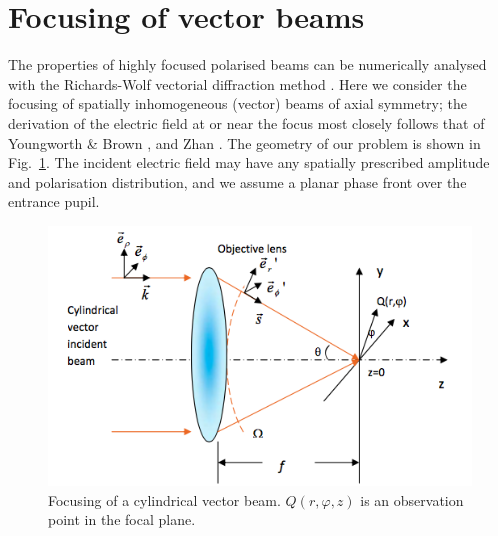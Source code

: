 \documentclass[12pt,a4paper]{article}
\begin{document}
\section{Focusing of vector beams}
The properties of highly focused polarised beams can be numerically analysed with the Richards-Wolf vectorial diffraction method \cite{richards_wolf}. Here we consider the focusing of spatially inhomogeneous (vector) beams of axial symmetry; the derivation of the electric field at or near the focus most closely follows that of Youngworth \& Brown \cite{youngworth_brown}, and Zhan \cite{zhan}. The geometry of our problem is shown in Fig.~\ref{fig:setup}. The incident electric field may have any spatially prescribed amplitude and polarisation distribution, and we assume a planar phase front over the entrance pupil.
\begin{figure}[h]
	\centering
	\includegraphics[width=12cm]{setup} 
	\caption{Focusing of a cylindrical vector beam. \(Q\!\left(r,\varphi,z\right)\) is an observation point in the focal plane.}
	\label{fig:setup}
\end{figure}
\end{document}
